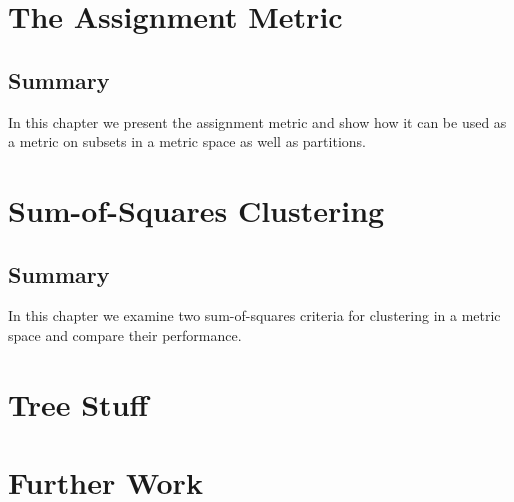 \documentclass[a4paper]{report}
\begin{document}
\chapter{The Assignment Metric}
\label{cha:assignment-metric}

\section{Summary}
\label{sec:asgn-met-summary}

In this chapter we present the assignment metric and show how it can be used
as a metric on subsets in a metric space as well as partitions.

\chapter{Sum-of-Squares Clustering}
\label{cha:sum-squar-clust}

\section{Summary}
\label{sec:summary-sum-squar}

In this chapter we examine two sum-of-squares criteria for clustering in a
metric space and compare their performance.

\chapter{Tree Stuff}
\label{cha:tree-stuff}



\chapter{Further Work}
\label{cha:further-work}





\end{document}
